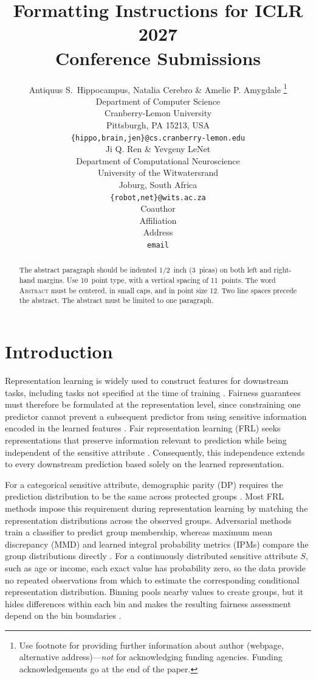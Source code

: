 \documentclass{article} %
\title{Formatting Instructions for ICLR 2027 \\ Conference Submissions}
\author{Antiquus S.~Hippocampus, Natalia Cerebro \& Amelie P. Amygdale \thanks{ Use footnote for providing further information
about author (webpage, alternative address)---\emph{not} for acknowledging
funding agencies.  Funding acknowledgements go at the end of the paper.} \\
Department of Computer Science\\
Cranberry-Lemon University\\
Pittsburgh, PA 15213, USA \\
\texttt{\{hippo,brain,jen\}@cs.cranberry-lemon.edu} \\
\And
Ji Q. Ren \& Yevgeny LeNet \\
Department of Computational Neuroscience \\
University of the Witwatersrand \\
Joburg, South Africa \\
\texttt{\{robot,net\}@wits.ac.za} \\
\AND
Coauthor \\
Affiliation \\
Address \\
\texttt{email}
}
\begin{document}
\maketitle

\begin{abstract}
The abstract paragraph should be indented 1/2~inch (3~picas) on both left and
right-hand margins. Use 10~point type, with a vertical spacing of 11~points.
The word \textsc{Abstract} must be centered, in small caps, and in point size 12. Two
line spaces precede the abstract. The abstract must be limited to one
paragraph.
\end{abstract}

\section{Introduction}

Representation learning is widely used to construct features for downstream tasks, including tasks not specified at the time of training \citep{bengio2013representation}.  Fairness guarantees must therefore be formulated at the representation level, since constraining one predictor cannot prevent a subsequent predictor from using sensitive information encoded in the learned features \citep{madras2018adversarially}.  Fair representation learning (FRL) seeks representations that preserve information relevant to prediction while being independent of the sensitive attribute \citep{zemel2013learning}.  Consequently, this independence extends to every downstream prediction based solely on the learned representation.

For a categorical sensitive attribute, demographic parity (DP) requires the prediction distribution to be the same across protected groups \citep{dwork2012fairness}.  Most FRL methods impose this requirement during representation learning by matching the representation distributions across the observed groups.  Adversarial methods train a classifier to predict group membership, whereas maximum mean discrepancy (MMD) and learned integral probability metrics (IPMs) compare the group distributions directly \citep{edwards2016censoring,louizos2016variational,madras2018adversarially,kim2022parametric,deka2023mmdbfair}.  For a continuously distributed sensitive attribute $S$, such as age or income, each exact value has probability zero, so the data provide no repeated observations from which to estimate the corresponding conditional representation distribution.  Binning pools nearby values to create groups, but it hides differences within each bin and makes the resulting fairness assessment depend on the bin boundaries \citep{mary2019continuous,kong2025fair}.
\end{document}

